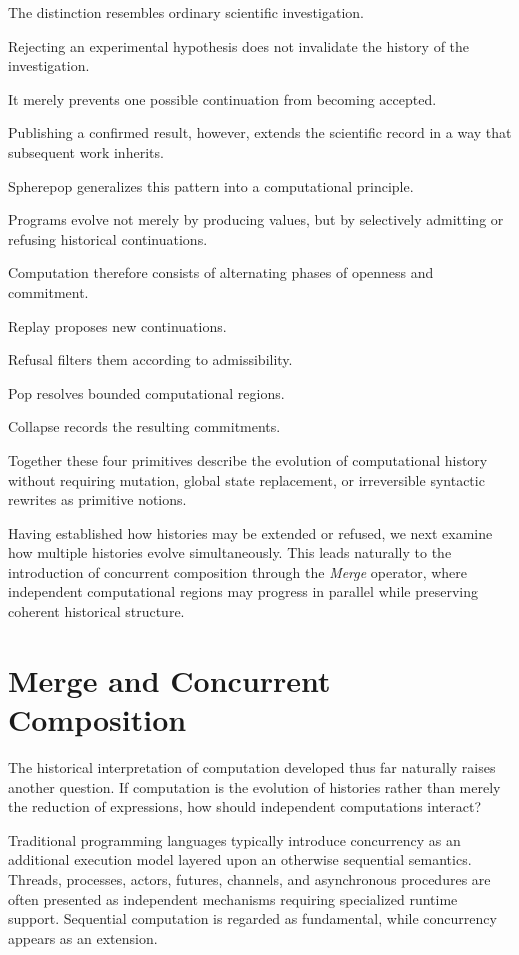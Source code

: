 \documentclass[12pt,oneside]{article}
\theoremstyle{definition}
\theoremstyle{remark}
\begin{document}
The distinction resembles ordinary scientific investigation.

Rejecting an experimental hypothesis does not invalidate the history of the
investigation.

It merely prevents one possible continuation from becoming accepted.

Publishing a confirmed result, however, extends the scientific record in a way
that subsequent work inherits.

Spherepop generalizes this pattern into a computational principle.

Programs evolve not merely by producing values, but by selectively admitting
or refusing historical continuations.

Computation therefore consists of alternating phases of openness and
commitment.

Replay proposes new continuations.

Refusal filters them according to admissibility.

Pop resolves bounded computational regions.

Collapse records the resulting commitments.

Together these four primitives describe the evolution of computational history
without requiring mutation, global state replacement, or irreversible
syntactic rewrites as primitive notions.

Having established how histories may be extended or refused, we next examine
how multiple histories evolve simultaneously. This leads naturally to the
introduction of concurrent composition through the \emph{Merge} operator,
where independent computational regions may progress in parallel while
preserving coherent historical structure.

\section{Merge and Concurrent Composition}

The historical interpretation of computation developed thus far naturally
raises another question. If computation is the evolution of histories rather
than merely the reduction of expressions, how should independent computations
interact?

Traditional programming languages typically introduce concurrency as an
additional execution model layered upon an otherwise sequential semantics.
Threads, processes, actors, futures, channels, and asynchronous procedures
are often presented as independent mechanisms requiring specialized runtime
support. Sequential computation is regarded as fundamental, while concurrency
appears as an extension.
\end{document}
